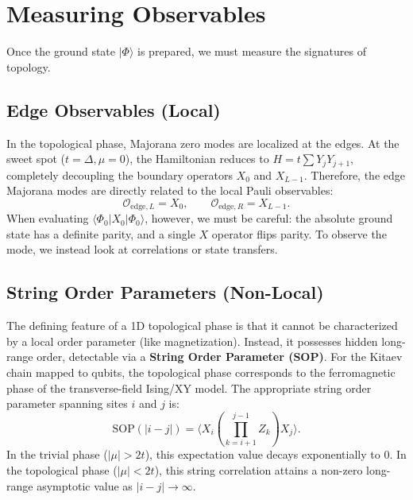 \documentclass[11pt]{article}
\newcommand{\ket}[1]{|#1\rangle}
\newcommand{\bra}[1]{\langle#1|}
\begin{document}
\section{Measuring Observables}

Once the ground state $\ket{\Phi}$ is prepared, we must measure the signatures of topology.

\subsection{Edge Observables (Local)}
In the topological phase, Majorana zero modes are localized at the edges. At the sweet spot ($t = \Delta, \mu = 0$), the Hamiltonian reduces to $H = t \sum Y_j Y_{j+1}$, completely decoupling the boundary operators $X_0$ and $X_{L-1}$. 
Therefore, the edge Majorana modes are directly related to the local Pauli observables:
\begin{equation}
  \mathcal{O}_{\text{edge}, L} = X_0, \qquad \mathcal{O}_{\text{edge}, R} = X_{L-1}.
\end{equation}
When evaluating $\bra{\Phi_0} X_0 \ket{\Phi_0}$, however, we must be careful: the absolute ground state has a definite parity, and a single $X$ operator flips parity. To observe the mode, we instead look at correlations or state transfers.

\subsection{String Order Parameters (Non-Local)}
The defining feature of a 1D topological phase is that it cannot be characterized by a local order parameter (like magnetization). Instead, it possesses hidden long-range order, detectable via a \textbf{String Order Parameter (SOP)}.
For the Kitaev chain mapped to qubits, the topological phase corresponds to the ferromagnetic phase of the transverse-field Ising/XY model. The appropriate string order parameter spanning sites $i$ and $j$ is:
\begin{equation}
  \text{SOP}(|i - j|) = \langle X_i \left( \prod_{k=i+1}^{j-1} Z_k \right) X_j \rangle.
\end{equation}
In the trivial phase ($|\mu| > 2t$), this expectation value decays exponentially to 0. 
In the topological phase ($|\mu| < 2t$), this string correlation attains a non-zero long-range asymptotic value as $|i-j| \to \infty$. 
\end{document}
